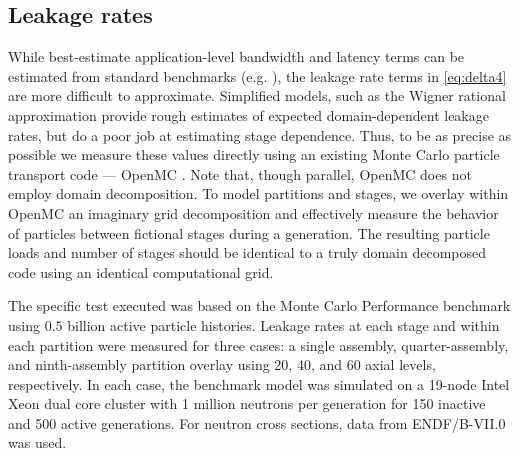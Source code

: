 \subsection{Leakage rates}

While best-estimate application-level bandwidth and latency terms can be
estimated from standard benchmarks (e.g. \cite{cpe-wallcraft-2000}), the leakage
rate terms in \eqref{eq:delta4} are more difficult to approximate. Simplified
models, such as the Wigner rational approximation \cite{ae-pashkin-1970} provide
rough estimates of expected domain-dependent leakage rates, but do a poor job at
estimating stage dependence. Thus, to be as precise as possible we measure these
values directly using an existing Monte Carlo particle transport code --- OpenMC
\cite{ane-romano-2013}. Note that, though parallel, OpenMC does not employ
domain decomposition. To model partitions and stages, we overlay within OpenMC
an imaginary grid decomposition and effectively measure the behavior of
particles between fictional stages during a generation. The resulting particle
loads and number of stages should be identical to a truly domain decomposed code
using an identical computational grid.

The specific test executed was based on the Monte Carlo Performance benchmark
\cite{mc-hoogenboom-2011} using $0.5$ billion active particle histories.
Leakage rates at each stage and within each partition were measured for three
cases: a single assembly, quarter-assembly, and ninth-assembly partition overlay
using 20, 40, and 60 axial levels, respectively. In each case, the benchmark
model was simulated on a 19-node Intel Xeon dual core cluster with 1 million
neutrons per generation for 150 inactive and 500 active generations. For neutron
cross sections, data from ENDF/B-VII.0 was used.

